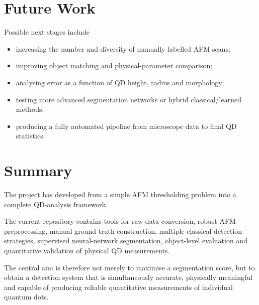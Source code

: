 \documentclass[11pt,a4paper]{article}
\begin{document}
\section{Future Work}

Possible next stages include

\begin{itemize}[itemsep=4pt]

    \item increasing the number and diversity of manually labelled AFM scans;

    \item improving object matching and physical-parameter comparison;

    \item analysing error as a function of QD height, radius and morphology;

    \item testing more advanced segmentation networks or hybrid classical/learned methods;

    \item producing a fully automated pipeline from microscope data to final QD statistics.

\end{itemize}


\section{Summary}

The project has developed from a simple AFM thresholding problem into a complete QD-analysis framework.

The current repository contains tools for raw-data conversion, robust AFM preprocessing, manual ground-truth construction, multiple classical detection strategies, supervised neural-network segmentation, object-level evaluation and quantitative validation of physical QD measurements.

The central aim is therefore not merely to maximise a segmentation score, but to obtain a detection system that is simultaneously accurate, physically meaningful and capable of producing reliable quantitative measurements of individual quantum dots.
\end{document}
